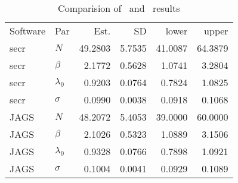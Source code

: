 
\begin{table}
\centering
\caption{Comparision of \jags~and \secr~results}
\begin{tabular}{llrrrr}
\hline
Software & Par & Est. & SD & lower & upper \\
 secr & $N$ & 49.2803 & 5.7535 & 41.0087 & 64.3879 \\
 secr & $\beta$ &  2.1772 & 0.5628 &  1.0741 &  3.2804 \\
 secr & $\lambda_0$ &  0.9203 & 0.0764 &  0.7824 &  1.0825 \\
 secr & $\sigma$ &  0.0990 & 0.0038 &  0.0918 &  0.1068 \\
 JAGS & $N$ & 48.2072 & 5.4053 & 39.0000 & 60.0000 \\
 JAGS & $\beta$ &  2.1026 & 0.5323 &  1.0889 &  3.1506 \\
 JAGS & $\lambda_0$ &  0.9328 & 0.0766 &  0.7898 &  1.0921 \\
 JAGS & $\sigma$ &  0.1004 & 0.0041 &  0.0929 &  0.1089 \\
 
\hline
\end{tabular}
\label{ch9:tab:simIPP}
\end{table}
